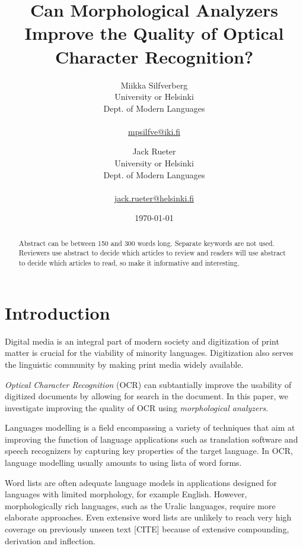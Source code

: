 \documentclass[b5paper]{article}
\begin{document}
\title{Can Morphological Analyzers Improve the Quality of Optical Character Recognition?}

\author{Miikka Silfverberg\\
University or Helsinki\\
Dept. of Modern Languages\\
\\
\url{mpsilfve@iki.fi} \and
Jack Rueter\\
University or Helsinki\\
Dept. of Modern Languages\\
\\
\url{jack.rueter@helsinki.fi} 
}

\date{\today}

\maketitle

\begin{abstract}
    Abstract can be between 150 and 300 words long. Separate keywords are not
    used. Reviewers use abstract to decide which articles to review and readers
    will use abstract to decide which articles to read, so make it informative
    and interesting.
\end{abstract}

\section{Introduction}

Digital media is an integral part of modern society and digitization
of print matter is crucial for the viability of minority
languages. Digitization also serves the linguistic community by making
print media widely available. 

{\it Optical Character Recognition} (OCR) can subtantially improve the
usability of digitized documents by allowing for search in
the document. In this paper, we investigate improving the quality of
OCR using {\it morphological analyzers}.


Languages modelling is a field encompassing a variety of
techniques that aim at improving the function of language applications
such as translation software and speech recognizers by capturing key
properties of the target language. In OCR, language modelling usually
amounts to using lista of word forms.

Word lists are often adequate language models in applications designed
for languages with limited morphology, for example English. However,
morphologically rich languages, such as the Uralic languages, require
more elaborate approaches. Even extensive word lists are unlikely to
reach very high coverage on previously unseen text [CITE] because of
extensive compounding, derivation and inflection.
\end{document}
